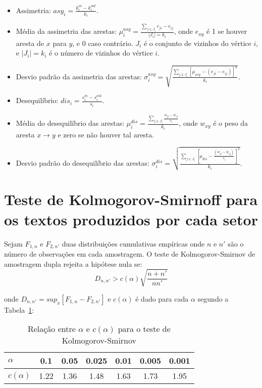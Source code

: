 \documentclass[a4paper,openright,12pt]{report} %
\begin{document}
\begin{itemize}
	\item Assimetria: $asy_i=\frac{k_i^{in}-k_i^{out}}{k_i}$.
	\item Média da assimetria das arestas: $\mu_i^{asy}=\frac{\sum_{j\in J_i} e_{ji}-e_{ij}}{|J_i|=k_i}$, onde $e_{xy}$ é 1 se houver aresta de $x$ para $y$, e $0$ caso contrário. $J_i$ é o conjunto de vizinhos do vértice $i$, e $|J_i|=k_i$ é o número de vizinhos do vértice $i$.
	\item Desvio padrão da assimetria das arestas: $\sigma_i^{asy}=\sqrt{\frac{\sum_{j\in J_i}[\mu_{asy} -(e_{ji}-e_{ij}) ]^2  }{k_i}  }$.
	\item Desequilíbrio: $dis_i=\frac{s_i^{in}-s_i^{out}}{s_i}$.
	\item Média do desequilíbrio das arestas: $\mu_i^{dis}=\frac{\sum_{j \in J_i}\frac{w_{ji}-w_{ij}}{s_i}}{k_i}$, onde $w_{xy}$ é o peso da aresta $x\rightarrow y$ e zero se não houver tal aresta.
	\item Desvio padrão do desequilíbrio das arestas: $\sigma_i^{dis}=\sqrt{\frac{\sum_{j\in J_i}[\mu_{dis}-\frac{(w_{ji}-w_{ij})}{s_i}]^2}{k_i}}$.
\end{itemize}

\section{Teste de Kolmogorov-Smirnoff para os textos produzidos por cada setor}

Sejam $F_{1,n}$ e $F_{2,n'}$ duas distribuições cumulativas empíricas onde $n$ e $n'$ são o número de observações em cada amostragem.
O teste de Kolmogorov-Smirnov de amostragem dupla 
rejeita a hipótese nula se:
\begin{equation}\label{eq:ks}
D_{n,n'} > c(\alpha)\sqrt{\frac{n+n'}{nn'}}
\end{equation}

onde $D_{n,n'}=sup_x[F_{1,n}-F_{2,n'}]$ e $c(\alpha)$ é dado para cada $\alpha$ segundo a Tabela~\ref{tab:kol}:

\begin{table}[!h]
\centering
\caption{Relação entre $\alpha$ e $c(\alpha)$ para o teste de Kolmogorov-Smirnov}\label{tab:kol}
\begin{tabular}{|l||c|c|c|c|c|c|}\hline
$\alpha$    & 0.1  & 0.05 & 0.025 & 0.01 & 0.005 & 0.001 \\\hline
$c(\alpha)$ & 1.22 & 1.36 & 1.48  & 1.63 & 1.73  & 1.95  \\\hline
\end{tabular}
\end{table}
\end{document}
